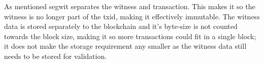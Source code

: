 As mentioned segwit separates the witness and transaction. This makes it so the witness is no longer part of the txid, making it effectively immutable. The witness data is stored separately to the blockchain and it's byte-size is not counted towards the block size, making it so more transactions could fit in a single block; it does not make the storage requirement any smaller as the witness data still needs to be stored for validation. 